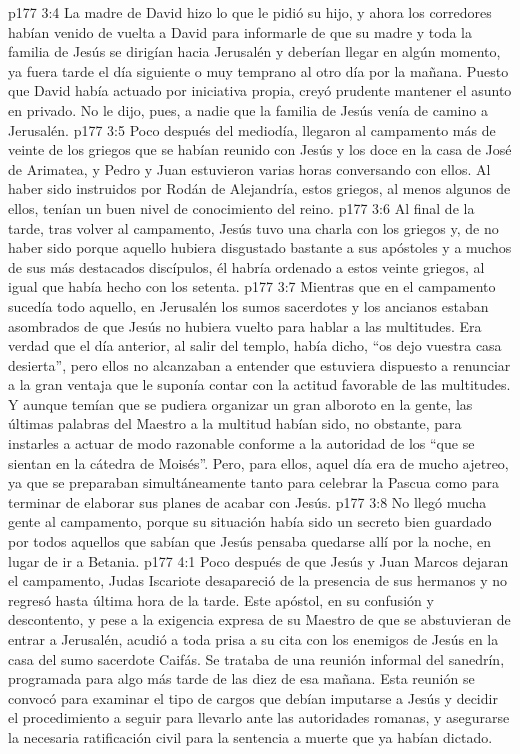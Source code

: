 \vs p177 3:4 La madre de David hizo lo que le pidió su hijo, y ahora los corredores habían venido de vuelta a David para informarle de que su madre y toda la familia de Jesús se dirigían hacia Jerusalén y deberían llegar en algún momento, ya fuera tarde el día siguiente o muy temprano al otro día por la mañana. Puesto que David había actuado por iniciativa propia, creyó prudente mantener el asunto en privado. No le dijo, pues, a nadie que la familia de Jesús venía de camino a Jerusalén.
\vs p177 3:5 \pc Poco después del mediodía, llegaron al campamento más de veinte de los griegos que se habían reunido con Jesús y los doce en la casa de José de Arimatea, y Pedro y Juan estuvieron varias horas conversando con ellos. Al haber sido instruidos por Rodán de Alejandría, estos griegos, al menos algunos de ellos, tenían un buen nivel de conocimiento del reino.
\vs p177 3:6 Al final de la tarde, tras volver al campamento, Jesús tuvo una charla con los griegos y, de no haber sido porque aquello hubiera disgustado bastante a sus apóstoles y a muchos de sus más destacados discípulos, él habría ordenado a estos veinte griegos, al igual que había hecho con los setenta.
\vs p177 3:7 \pc Mientras que en el campamento sucedía todo aquello, en Jerusalén los sumos sacerdotes y los ancianos estaban asombrados de que Jesús no hubiera vuelto para hablar a las multitudes. Era verdad que el día anterior, al salir del templo, había dicho, “os dejo vuestra casa desierta”, pero ellos no alcanzaban a entender que estuviera dispuesto a renunciar a la gran ventaja que le suponía contar con la actitud favorable de las multitudes. Y aunque temían que se pudiera organizar un gran alboroto en la gente, las últimas palabras del Maestro a la multitud habían sido, no obstante, para instarles a actuar de modo razonable conforme a la autoridad de los “que se sientan en la cátedra de Moisés”. Pero, para ellos, aquel día era de mucho ajetreo, ya que se preparaban simultáneamente tanto para celebrar la Pascua como para terminar de elaborar sus planes de acabar con Jesús.
\vs p177 3:8 \pc No llegó mucha gente al campamento, porque su situación había sido un secreto bien guardado por todos aquellos que sabían que Jesús pensaba quedarse allí por la noche, en lugar de ir a Betania.
\vs p177 4:1 Poco después de que Jesús y Juan Marcos dejaran el campamento, Judas Iscariote desapareció de la presencia de sus hermanos y no regresó hasta última hora de la tarde. Este apóstol, en su confusión y descontento, y pese a la exigencia expresa de su Maestro de que se abstuvieran de entrar a Jerusalén, acudió a toda prisa a su cita con los enemigos de Jesús en la casa del sumo sacerdote Caifás. Se trataba de una reunión informal del sanedrín, programada para algo más tarde de las diez de esa mañana. Esta reunión se convocó para examinar el tipo de cargos que debían imputarse a Jesús y decidir el procedimiento a seguir para llevarlo ante las autoridades romanas, y asegurarse la necesaria ratificación civil para la sentencia a muerte que ya habían dictado.
